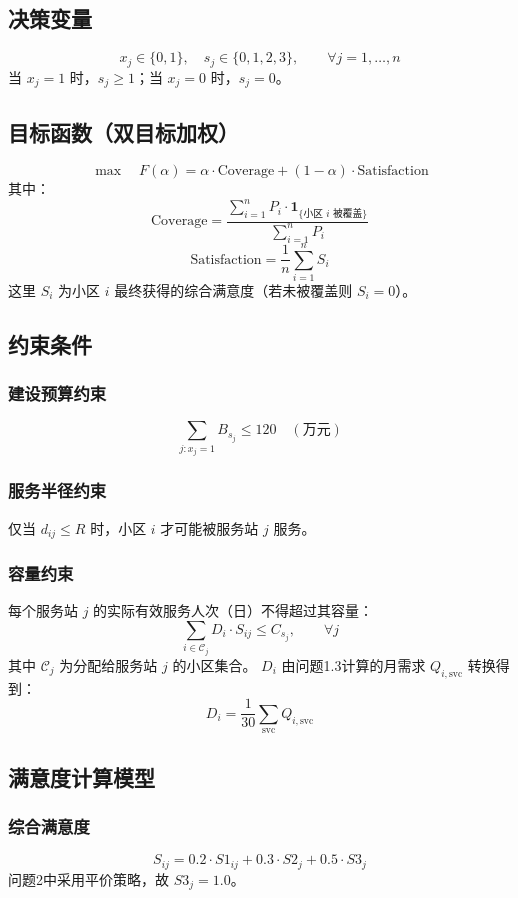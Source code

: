 \documentclass[12pt,a4paper]{article}
\begin{document}
\subsection{决策变量}
\[
x_j \in \{0,1\},\quad s_j \in \{0,1,2,3\},\qquad \forall j = 1,\dots,n
\]
当 $x_j = 1$ 时，$s_j \ge 1$；当 $x_j = 0$ 时，$s_j = 0$。

\subsection{目标函数（双目标加权）}
\[
\max \quad F(\alpha) = \alpha \cdot \text{Coverage} + (1 - \alpha) \cdot \text{Satisfaction}
\]
其中：
\[
\text{Coverage} = \frac{\displaystyle\sum_{i=1}^{n} P_i \cdot \mathbf{1}_{\{\text{小区 } i \text{ 被覆盖}\}}}{\displaystyle\sum_{i=1}^{n} P_i}
\]
\[
\text{Satisfaction} = \frac{1}{n}\sum_{i=1}^{n} S_i
\]
这里 $S_i$ 为小区 $i$ 最终获得的综合满意度（若未被覆盖则 $S_i = 0$）。

\subsection{约束条件}

\subsubsection{建设预算约束}
\[
\sum_{j: x_j = 1} B_{s_j} \le 120 \quad (\text{万元})
\]

\subsubsection{服务半径约束}
仅当 $d_{ij} \le R$ 时，小区 $i$ 才可能被服务站 $j$ 服务。

\subsubsection{容量约束}
每个服务站 $j$ 的实际有效服务人次（日）不得超过其容量：
\[
\sum_{i \in \mathcal{C}_j} D_i \cdot S_{ij} \le C_{s_j}, \qquad \forall j
\]
其中 $\mathcal{C}_j$ 为分配给服务站 $j$ 的小区集合。
$D_i$ 由问题1.3计算的月需求 $Q_{i,\text{svc}}$ 转换得到：
\[
D_i = \frac{1}{30} \sum_{\text{svc}} Q_{i,\text{svc}}
\]

\subsection{满意度计算模型}

\subsubsection{综合满意度}
\[
S_{ij} = 0.2 \cdot S1_{ij} + 0.3 \cdot S2_j + 0.5 \cdot S3_j
\]
问题2中采用平价策略，故 $S3_j = 1.0$。
\end{document}

